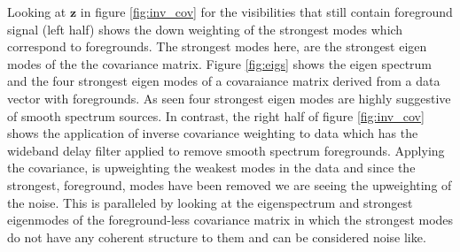 \documentclass[twocolumn,numberedappendix]{emulateapj} \shorttitle{PSA64}
\begin{document}
Looking at $\mathbf{z}$ in figure \ref{fig:inv_cov} for the visibilities that
still contain foreground signal (left half) shows the down weighting of
the strongest modes which correspond to foregrounds. The strongest modes here,
are the strongest eigen modes of the the covariance matrix. Figure
\ref{fig:eigs} shows the eigen spectrum and the four strongest eigen modes of a
covaraiance matrix derived from a data vector with foregrounds. As seen four
strongest eigen modes are highly suggestive of smooth spectrum sources. In
contrast, the right half of figure \ref{fig:inv_cov} shows the application of
inverse covariance weighting to data which has the wideband delay filter applied
to remove smooth spectrum foregrounds. Applying the covariance, is upweighting
the weakest modes in the data and since the strongest, foreground, modes have
been removed we are seeing the upweighting of the noise. This is paralleled by
looking at the eigenspectrum and strongest eigenmodes of the foreground-less
covariance matrix in which the strongest modes do not have any coherent
structure to them and can be considered noise like.
\end{document}
